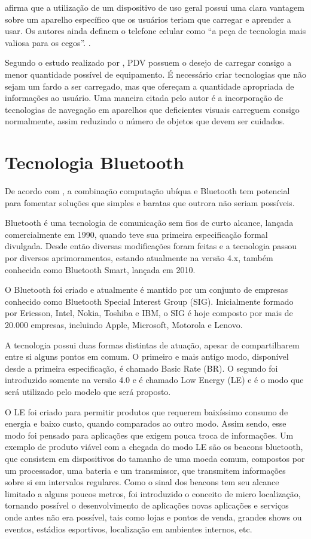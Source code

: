 \documentclass[english,brazilian]{UNISINOSmonografia}
\begin{document}
 afirma que a utilização de um dispositivo de uso geral possui uma clara vantagem sobre um aparelho específico que os usuários teriam que carregar e aprender a usar. Os autores ainda definem o telefone celular como “a peça de tecnologia mais valiosa para os cegos”. \cite{mau2008blindaid}.

Segundo o estudo realizado por , PDV possuem o desejo de carregar consigo a menor quantidade possível de equipamento. É necessário criar tecnologias que não sejam um fardo a ser carregado, mas que ofereçam a quantidade apropriada de informações ao usuário. Uma maneira citada pelo autor é a incorporação de tecnologias de navegação em aparelhos que deficientes visuais carreguem consigo normalmente, assim reduzindo o número de objetos que devem ser cuidados.

	\section{Tecnologia Bluetooth}

De acordo com , a combinação computação ubíqua e Bluetooth tem potencial para fomentar soluções que simples e baratas que outrora não seriam possíveis.

Bluetooth é uma tecnologia de comunicação sem fios de curto alcance, lançada comercialmente em 1990, quando teve sua primeira especificação formal divulgada. Desde então diversas modificações foram feitas e a tecnologia passou por diversos aprimoramentos, estando atualmente na versão 4.x, também conhecida como Bluetooth Smart, lançada em 2010. 

O Bluetooth foi criado e atualmente é mantido por um conjunto de empresas conhecido como Bluetooth Special Interest Group (SIG). Inicialmente formado por Ericsson, Intel, Nokia, Toshiba e IBM, o SIG é hoje composto por mais de 20.000 empresas, incluindo Apple, Microsoft, Motorola e Lenovo.

A tecnologia possui duas formas distintas de atuação, apesar de compartilharem entre si alguns pontos em comum. O primeiro e mais antigo modo, disponível desde a primeira especificação, é chamado Basic Rate (BR). O segundo foi introduzido somente na versão 4.0 e é chamado Low Energy (LE) e é o modo que será utilizado pelo modelo que será proposto.

O LE foi criado para permitir produtos que requerem baixíssimo consumo de energia e baixo custo, quando comparados ao outro modo. Assim sendo, esse modo foi pensado para aplicações que exigem pouca troca de informações. Um exemplo de produto viável com a chegada do modo LE são os beacons bluetooth, que consistem em dispositivos do tamanho de uma moeda comum, compostos por um processador, uma bateria e um transmissor, que transmitem informações sobre si em intervalos regulares. Como o sinal dos beacons tem seu alcance limitado a alguns poucos metros, foi introduzido o conceito de micro localização, tornando possível o desenvolvimento de aplicações novas aplicações e serviços onde antes não era possível, tais como lojas e pontos de venda, grandes shows ou eventos, estádios esportivos, localização em ambientes internos, etc.
\end{document}

